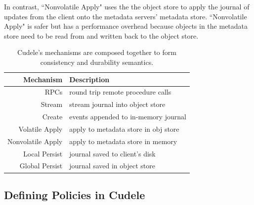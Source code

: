 In contrast, ``Nonvolatile Apply" uses the the object store to apply the
journal of updates from the client onto the metadata servers' metadata store.
``Nonvolatile Apply" is safer but has a performance overhead because objects in
the metadata store need to be read from and written back to the object store.


\begin{table}
\begin{tabular}{ r | l }
  Mechanism         & Description \\\hline
  RPCs              & round trip remote procedure calls \\
  Stream            & stream journal into object store \\
  Create            & events appended to in-memory journal \\
  Volatile Apply    & apply to metadata store in obj store \\
  Nonvolatile Apply & apply to metadata store in memory \\
  Local Persist     & journal saved to client's disk \\
  Global Persist    & journal saved in object store \\
\end{tabular}
\caption{Cudele's mechanisms are composed together to form consistency and
durability semantics.\label{table:mechanisms}} 
\end{table}

\subsection{Defining Policies in Cudele}
\label{sec:setting-policies-with-cudele}

